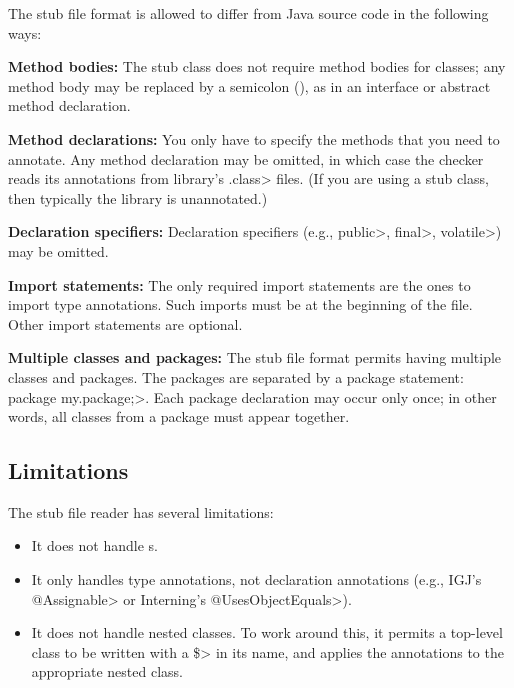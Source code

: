 The stub file format is allowed to differ from Java source code in the
following ways:
\begin{description}

\item{\textbf{Method bodies:}}
  The stub class does not require method bodies for classes; any method
  body may be replaced by a semicolon (\code{;}), as in an interface or
  abstract method declaration.

\item{\textbf{Method declarations:}}
  You only have to specify the methods that you need to annotate.
  Any method declaration may be omitted, in which case the checker reads
  its annotations from library's \<.class> files.  (If you are using a stub class, then
  typically the library is unannotated.)

\item{\textbf{Declaration specifiers:}}
  Declaration specifiers (e.g., \<public>, \<final>, \<volatile>)
  may be omitted.

\item{\textbf{Import statements:}}
  The only required import statements are the ones to import type
  annotations.  Such imports must be at the beginning of the
  file.  Other import statements are optional.

\item{\textbf{Multiple classes and packages:}}
  The stub file format permits having multiple classes and packages.
  The packages are separated by a package statement:
  \<package my.package;>.  Each package declaration may occur only once; in
  other words, all classes from a package must appear together.

\end{description}


\subsection{Limitations\label{stub-limitations}}

The stub file reader has several limitations:

\begin{itemize}
\item
  It does not handle s.
\item
  It only handles type annotations, not declaration annotations (e.g.,
  IGJ's \<@Assignable> or Interning's \<@UsesObjectEquals>).
\item
  It does not handle nested classes.  To work around this, it permits a
  top-level class to be written with a \<\$> in its name, and applies the
  annotations to the appropriate nested class.
\end{itemize}

